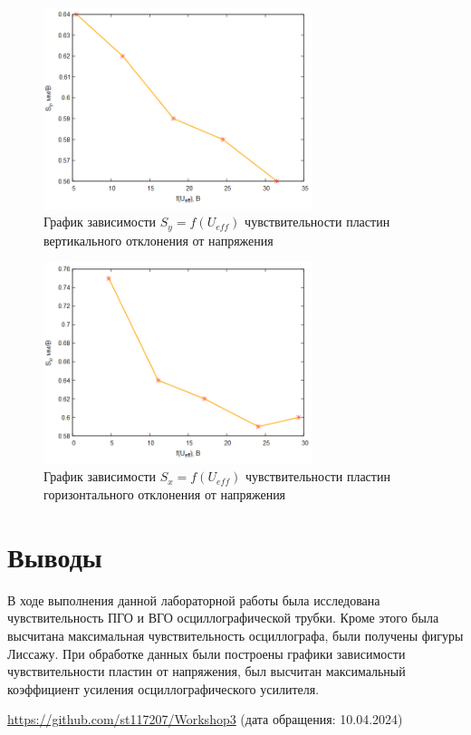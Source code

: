 \begin{figure}[H]
\centering
\includegraphics[width=0.7\textwidth]{График 1.png}
\caption{График зависимости $S_y=f(U_{eff})$ чувствительности пластин вертикального отклонения от напряжения}
\label{fig:graph1}
\end{figure}
\begin{figure}[H]
\centering
\includegraphics[width=0.7\textwidth]{График 2.png}
\caption{График зависимости $S_x=f(U_{eff})$ чувствительности пластин горизонтального отклонения от напряжения}
\label{fig:graph2}
\end{figure}




\section{Выводы}
В ходе выполнения данной лабораторной работы была исследована чувствительность ПГО и ВГО осциллографической трубки. Кроме этого была высчитана максимальная чувствительность осциллографа, были получены фигуры Лиссажу. При обработке данных были построены графики зависимости чувствительности пластин от напряжения, был высчитан максимальный коэффициент усиления осциллографического усилителя.


\begin{thebibliography}{9}

\url{https://github.com/st117207/Workshop3}  (дата обращения: 10.04.2024) 


\end{thebibliography}

